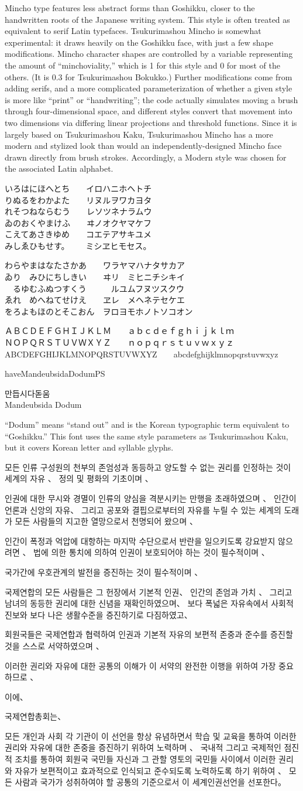 \documentclass[14pt]{extarticle}
\newcommand{\iroha}{%
いろはにほへとち~~~~イロハニホヘトチ\\
りぬるをわかよた~~~~リヌルヲワカヨタ\\
れそつねならむう~~~~レソツネナラムウ\\
ゐのおくやまけふ~~~~ヰノオクヤマケフ\\
こえてあさきゆめ~~~~コエテアサキユメ\\
みしゑひもせす。~~~~ミシヱヒモセス。\par
}
\newcommand{\gojuuonzu}{%
わらやまはなたさかあ~~~~ワラヤマハナタサカア\\
ゐり~~みひにちしきい~~~~ヰリ~~ミヒニチシキイ\\
~~るゆむふぬつすくう~~~~~~ルユムフヌツスクウ\\
ゑれ~~めへねてせけえ~~~~ヱレ~~メヘネテセケエ\\
をろよもほのとそこおん~~ヲロヨモホノトソコオン\par
}
\newcommand{\undecl}{%
모든 인류 구성원의 천부의 존엄성과 동등하고 양도할 수 없는 권리를 인정하는
것이 세계의 자유 、 정의 및 평화의 기초이며 、

인권에 대한 무시와 경멸이 인류의 양심을 격분시키는 만행을 초래하였으며 、
인간이 언론과 신앙의 자유、 그리고 공포와 결핍으로부터의 자유를 누릴 수 있는
세계의 도래가 모든 사람들의 지고한 열망으로서 천명되어 왔으며 、

인간이 폭정과 억압에 대항하는 마지막 수단으로서 반란을 일으키도록 강요받지
않으려면 、 법에 의한 통치에 의하여 인권이 보호되어야 하는 것이 필수적이며 、

국가간에 우호관계의 발전을 증진하는 것이 필수적이며 、

국제연합의 모든 사람들은 그 헌장에서 기본적 인권、 인간의 존엄과 가치 、
그리고 남녀의 동등한 권리에 대한 신념을 재확인하였으며、 보다 폭넓은
자유속에서 사회적 진보와 보다 나은 생활수준을 증진하기로 다짐하였고、

회원국들은 국제연합과 협력하여 인권과 기본적 자유의 보편적 존중과 준수를
증진할 것을 스스로 서약하였으며 、

이러한 권리와 자유에 대한 공통의 이해가 이 서약의 완전한 이행을 위하여 가장
중요하므로 、

이에、

국제연합총회는、

모든 개인과 사회 각 기관이 이 선언을 항상 유념하면서 학습 및 교육을 통하여
이러한 권리와 자유에 대한 존중을 증진하기 위하여 노력하며 、 국내적 그리고
국제적인 점진적 조치를 통하여 회원국 국민들 자신과 그 관할 영토의 국민들
사이에서 이러한 권리와 자유가 보편적이고 효과적으로 인식되고 준수되도록
노력하도록 하기 위하여 、 모든 사람과 국가가 성취하여야 할 공통의 기준으로서
이 세계인권선언을 선포한다。 
\par
}
\begin{document}
\normalsize

Mincho type features less abstract forms than Goshikku, closer to the
handwritten roots of the Japanese writing system.  This style is often
treated as equivalent to serif Latin typefaces.  Tsukurimashou Mincho is
somewhat experimental: it draws heavily on the Goshikku face, with just a
few shape modifications.  Mincho character shapes are controlled by a
variable representing the amount of ``minchoviality,'' which is 1 for this
style and 0 for most of the others.  (It is 0.3 for Tsukurimashou Bokukko.)
Further modifications come from adding serifs, and a more complicated
parameterization of whether a given style is more like ``print'' or
``handwriting''; the code actually simulates moving a brush through
four-dimensional space, and different styles convert that movement into two
dimensions via differing linear projections and threshold functions. Since
it is largely based on Tsukurimashou Kaku, Tsukurimashou Mincho has a more
modern and stylized look than would an independently-designed Mincho face
drawn directly from brush strokes.  Accordingly, a Modern style was chosen
for the associated Latin alphabet.

\minchomono
\iroha
\gojuuonzu

ＡＢＣＤＥＦＧＨＩＪＫＬＭ~~~~ａｂｃｄｅｆｇｈｉｊｋｌｍ\\
ＮＯＰＱＲＳＴＵＶＷＸＹＺ~~~~ｎｏｐｑｒｓｔｕｖｗｘｙｚ\\
ABCDEFGHIJKLMNOPQRSTUVWXYZ~~~~abcdefghijklmnopqrstuvwxyz

\clearpage

\fi


\expandafter\ifx\csname haveMandeubsidaDodumPS\endcsname\relax\else

\dodum

\Large
만듭시다돋움\\
Mandeubsida Dodum

\normalsize

``Dodum'' means ``stand out'' and is the Korean typographic term equivalent
to ``Goshikku.''  This font uses the same style parameters as Tsukurimashou
Kaku, but it covers Korean letter and syllable glyphs.

\undecl

\clearpage

\fi

\end{document}
